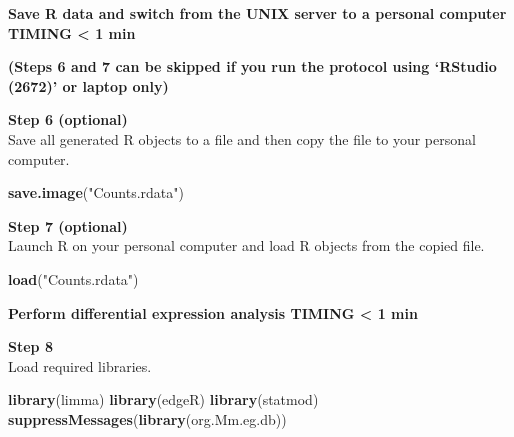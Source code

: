 \documentclass[]{book}
\newenvironment{Shaded}{\begin{snugshade}}{\end{snugshade}}
\newcommand{\DataTypeTok}[1]{\textcolor[rgb]{0.13,0.29,0.53}{#1}}
\newcommand{\DecValTok}[1]{\textcolor[rgb]{0.00,0.00,0.81}{#1}}
\newcommand{\KeywordTok}[1]{\textcolor[rgb]{0.13,0.29,0.53}{\textbf{#1}}}
\newcommand{\NormalTok}[1]{#1}
\newcommand{\OperatorTok}[1]{\textcolor[rgb]{0.81,0.36,0.00}{\textbf{#1}}}
\newcommand{\StringTok}[1]{\textcolor[rgb]{0.31,0.60,0.02}{#1}}
\begin{document}
\begin{Shaded}
\end{Shaded}

\textbf{Save R data and switch from the UNIX server to a personal computer TIMING \textless{} 1 min}

\textbf{(Steps 6 and 7 can be skipped if you run the protocol using `RStudio (2672)' or laptop only)}

\textbf{Step 6 (optional)}\\

Save all generated R objects to a file and then copy the file to your personal computer.

\begin{Shaded}
\begin{Highlighting}[]
\KeywordTok{save.image}\NormalTok{(}\StringTok{"Counts.rdata"}\NormalTok{)}
\end{Highlighting}
\end{Shaded}

\textbf{Step 7 (optional)}\\

Launch R on your personal computer and load R objects from the copied file.

\begin{Shaded}
\begin{Highlighting}[]
\KeywordTok{load}\NormalTok{(}\StringTok{"Counts.rdata"}\NormalTok{)}
\end{Highlighting}
\end{Shaded}

\textbf{Perform differential expression analysis TIMING \textless{} 1 min}

\textbf{Step 8}\\

Load required libraries.

\begin{Shaded}
\begin{Highlighting}[]
\KeywordTok{library}\NormalTok{(limma)}
\KeywordTok{library}\NormalTok{(edgeR)}
\KeywordTok{library}\NormalTok{(statmod)}
\KeywordTok{suppressMessages}\NormalTok{(}\KeywordTok{library}\NormalTok{(org.Mm.eg.db))}
\end{Highlighting}
\end{Shaded}
\end{document}
